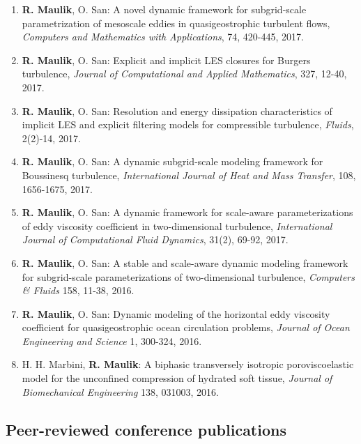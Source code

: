\documentclass[letterpaper]{article}
\begin{document}
\begin{enumerate}
\item \textbf{R. Maulik}, O. San: A novel dynamic framework for subgrid-scale parametrization of mesoscale eddies in quasigeostrophic turbulent flows, {\it Computers and Mathematics with Applications}, 74, 420-445, 2017. 

\item \textbf{R. Maulik}, O. San: Explicit and implicit LES closures for Burgers turbulence, {\it Journal of Computational and Applied Mathematics}, 327, 12-40, 2017. 

\item \textbf{R. Maulik}, O. San: Resolution and energy dissipation characteristics of implicit LES and explicit filtering models for compressible turbulence, {\it Fluids}, 2(2)-14, 2017. 

\item \textbf{R. Maulik}, O. San: A dynamic subgrid-scale modeling framework for Boussinesq turbulence, {\it International Journal of Heat and Mass Transfer}, 108, 1656-1675, 2017. 

\item \textbf{R. Maulik}, O. San: A dynamic framework for scale-aware parameterizations of eddy viscosity coefficient in two-dimensional turbulence, {\it International Journal of Computational Fluid Dynamics}, 31(2), 69-92, 2017. 

\item \textbf{R. Maulik}, O. San: A stable and scale-aware dynamic modeling framework for subgrid-scale parameterizations of two-dimensional turbulence, {\it Computers \& Fluids} 158, 11-38, 2016. 

\item \textbf{R. Maulik}, O. San: Dynamic modeling of the horizontal eddy viscosity coefficient for quasigeostrophic ocean circulation problems, {\it Journal of Ocean Engineering and Science} 1, 300-324, 2016.

\item H. H. Marbini, \textbf{R. Maulik}: A biphasic transversely isotropic poroviscoelastic model for the unconfined compression of hydrated soft tissue, {\it Journal of Biomechanical Engineering} 138, 031003, 2016.

\end{enumerate}

\subsection*{Peer-reviewed conference publications}
\end{document}
